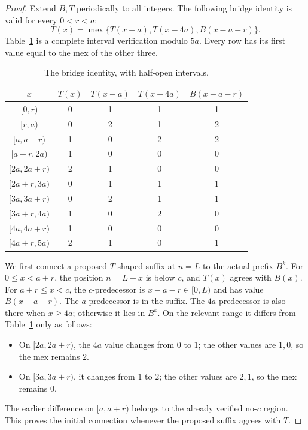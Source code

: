 \documentclass[11pt]{article}
\theoremstyle{remark}\newtheorem{remark}[theorem]{Remark}
\DeclareMathOperator{\mex}{mex}
\newcommand{\half}[2]{[#1,#2)}
\begin{document}
\begin{proof}
Extend $B,T$ periodically to all integers. The following bridge identity is valid for every $0<r<a$:
\begin{equation}\label{eq:bridge}
 T(x)=\mex\{T(x-a),T(x-4a),B(x-a-r)\}.
\end{equation}
Table~\ref{tab:bridge} is a complete interval verification modulo $5a$. Every row has its first value equal to the mex of the other three.
\begin{table}[ht]\centering\small
\begin{tabular}{c|c|ccc}\toprule
$x$ & $T(x)$ & $T(x-a)$ & $T(x-4a)$ & $B(x-a-r)$\\\midrule
$[0,r)$&0&1&1&1\\
$[r,a)$&0&2&1&2\\
$[a,a+r)$&1&0&2&2\\
$[a+r,2a)$&1&0&0&0\\
$[2a,2a+r)$&2&1&0&0\\
$[2a+r,3a)$&0&1&1&1\\
$[3a,3a+r)$&0&2&1&1\\
$[3a+r,4a)$&1&0&2&0\\
$[4a,4a+r)$&1&0&0&0\\
$[4a+r,5a)$&2&1&0&1\\\bottomrule
\end{tabular}
\caption{The bridge identity, with half-open intervals.}\label{tab:bridge}
\end{table}

We first connect a proposed $T$-shaped suffix at $n=L$ to the actual prefix $B^k$. For $0\le x<a+r$, the position $n=L+x$ is below $c$, and $T(x)$ agrees with $B(x)$. For $a+r\le x<c$, the $c$-predecessor is $x-a-r\in\half0L$ and has value $B(x-a-r)$. The $a$-predecessor is in the suffix. The $4a$-predecessor is also there when $x\ge4a$; otherwise it lies in $B^k$. On the relevant range it differs from Table~\ref{tab:bridge} only as follows:
\begin{itemize}
\item On $\half{2a}{2a+r}$, the $4a$ value changes from $0$ to $1$; the other values are $1,0$, so the mex remains $2$.
\item On $\half{3a}{3a+r}$, it changes from $1$ to $2$; the other values are $2,1$, so the mex remains $0$.
\end{itemize}
The earlier difference on $\half a{a+r}$ belongs to the already verified no-$c$ region. This proves the initial connection whenever the proposed suffix agrees with $T$.


\end{proof}
\end{document}
